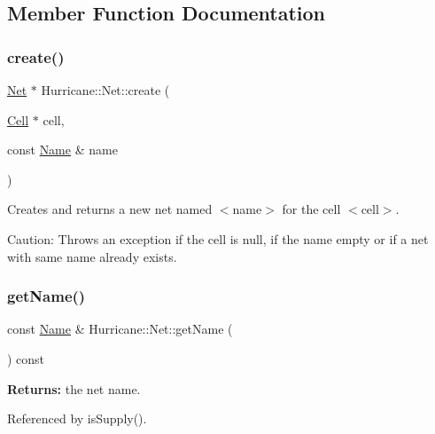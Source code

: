 \subsection{Member Function Documentation}
\mbox{\label{classHurricane_1_1Net_ac1524cea15e8eacbf992c0cfb9e481db}} 
\subsubsection{\texorpdfstring{create()}{create()}}
{\footnotesize\ttfamily \hyperlink{classHurricane_1_1Net}{Net} $\ast$ Hurricane\+::\+Net\+::create (\begin{DoxyParamCaption}\item[{\hyperlink{classHurricane_1_1Cell}{Cell} $\ast$}]{cell,  }\item[{const \hyperlink{classHurricane_1_1Name}{Name} \&}]{name }\end{DoxyParamCaption})\hspace{0.3cm}{\ttfamily [static]}}

Creates and returns a new net named {\ttfamily $<$name$>$} for the cell {\ttfamily $<$cell$>$}.

\begin{DoxyParagraph}{Caution\+:}
Throws an exception if the cell is null, if the name empty or if a net with same name already exists. 
\end{DoxyParagraph}
\mbox{\label{classHurricane_1_1Net_aeba73ca641db371dde29baf348b58bba}} 
\subsubsection{\texorpdfstring{get\+Name()}{getName()}}
{\footnotesize\ttfamily const \hyperlink{classHurricane_1_1Name}{Name} \& Hurricane\+::\+Net\+::get\+Name (\begin{DoxyParamCaption}{ }\end{DoxyParamCaption}) const\hspace{0.3cm}{\ttfamily [inline]}}

{\bfseries Returns\+:} the net name. 

Referenced by is\+Supply().

